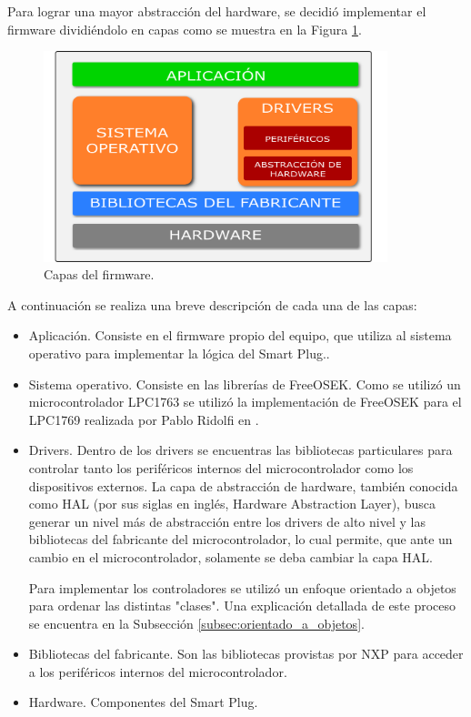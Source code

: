 Para lograr una mayor abstracción del hardware, se decidió implementar el firmware dividiéndolo en capas como se muestra en la Figura \ref{fig:firmware_diagrama_capas}.

\begin{figure}[h]
	\centering
	\includegraphics[width=10cm]{./Figures/3_2_2_firmware_diagrama_capas.png}
	\caption{Capas del firmware.}
	\label{fig:firmware_diagrama_capas}
\end{figure}

A continuación se realiza una breve descripción de cada una de las capas:

\begin{itemize}
\item Aplicación. Consiste en el firmware propio del equipo, que utiliza al sistema operativo para implementar la lógica del Smart Plug..
\item Sistema operativo. Consiste en las librerías de FreeOSEK. Como se utilizó un microcontrolador LPC1763 se utilizó la implementación de FreeOSEK para el LPC1769 realizada por Pablo Ridolfi en \citep{repo_ridolfi_freeosek}.
\item Drivers. Dentro de los drivers se encuentras las bibliotecas particulares para controlar tanto los periféricos internos del microcontrolador como los dispositivos externos. La capa de abstracción de hardware, también conocida como HAL (por sus siglas en inglés, Hardware Abstraction Layer), busca generar un nivel más de abstracción entre los drivers de alto nivel y las bibliotecas del fabricante del microcontrolador, lo cual permite, que ante un cambio en el microcontrolador, solamente se deba cambiar la capa HAL.

Para implementar los controladores se utilizó un enfoque orientado a objetos para ordenar las distintas "clases".  Una explicación detallada de este proceso se encuentra en la Subsección \ref{subsec:orientado_a_objetos}.
\item Bibliotecas del fabricante. Son las bibliotecas provistas por NXP para acceder a los periféricos internos del microcontrolador.
\item Hardware. Componentes del Smart Plug.
\end{itemize}

